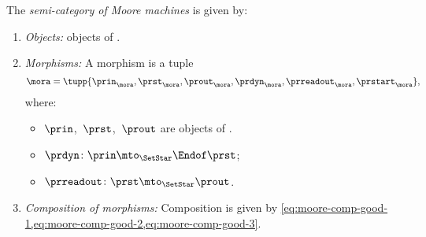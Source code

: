 \begin{definition}[\Moore]
    \label{def:Moore}
    The \emph{semi-category of Moore machines} \Moore is given by:
    \begin{enumerate}
        \item \emph{Objects:} objects of \SetStar.
        \item \emph{Morphisms:} A morphism is a tuple
        \begin{equation}
            \mora = \tupp{\prin_{\mora},\prst_{\mora},\prout_{\mora},\prdyn_{\mora},\prreadout_{\mora},\prstart_{\mora}},
        \end{equation}
        where:
        \begin{itemize}
            \item $\prin$,~$\prst$,~$\prout$ are objects of \SetStar.
            \item $ \prdyn \colon \prin \mto_\SetStar  \Endof \prst$;
            \item $ \prreadout \colon \prst  \mto_\SetStar \prout$.
        \end{itemize}
        \item \emph{Composition of morphisms:} Composition is given by
        \cref{eq:moore-comp-good-1,eq:moore-comp-good-2,eq:moore-comp-good-3}.
    \end{enumerate}
\end{definition}

